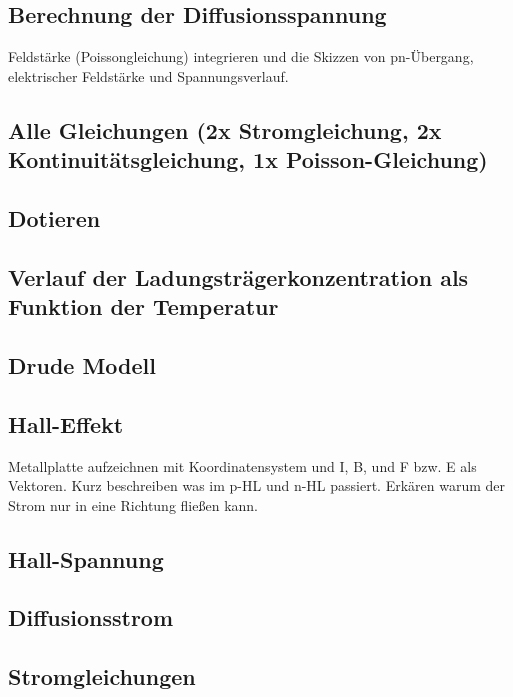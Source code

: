 \documentclass{article}
\begin{document}
\subsection{Berechnung der Diffusionsspannung }\label{k3:diffusion}
Feldst\"arke (Poissongleichung) integrieren und die Skizzen von pn-\"Ubergang, elektrischer
Feldst\"arke und Spannungsverlauf.

\subsection{Alle Gleichungen (2x Stromgleichung, 2x Kontinuitätsgleichung, 1x Poisson-Gleichung) }\label{k3:alleGleichungen}

\subsection{Dotieren }\label{k3:dotieren}

\subsection{Verlauf der Ladungstr\"agerkonzentration als Funktion der Temperatur }\label{k3:ladungstraegerkonz}

\subsection{Drude Modell }\label{k3:drude}

\subsection{Hall-Effekt }\label{k3:halleffekt}
Metallplatte aufzeichnen mit Koordinatensystem und I, B, und F bzw. E als Vektoren.
Kurz beschreiben was im p-HL und n-HL passiert.
Erk\"aren warum der Strom nur in eine Richtung flie{\ss}en kann.

\subsection{Hall-Spannung }\label{k3:hallspannung}

\subsection{Diffusionsstrom }\label{k3:diffusionsstrom}

\subsection{Stromgleichungen }\label{k3:stromgleichungen}
\end{document}
